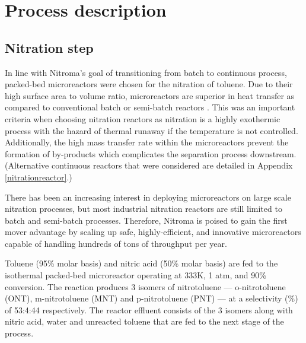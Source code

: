 \section{Process description}
\label{sec:process}
\subsection{Nitration step}
In line with Nitroma's goal of transitioning from batch to continuous process, packed-bed microreactors were chosen for the nitration of toluene. Due to their high surface area to volume ratio, microreactors are superior in heat transfer as compared to conventional batch or semi-batch reactors \cite{halder_nitration_2007}. This was an important criteria when choosing nitration reactors as nitration is a highly exothermic process with the hazard of thermal runaway if the temperature is not controlled. Additionally, the high mass transfer rate within the microreactors prevent the formation of by-products \cite{halder_nitration_2007} which complicates the separation process downstream.
(Alternative continuous reactors that were considered are detailed in Appendix \ref{nitrationreactor}.)

There has been an increasing interest in deploying microreactors on large scale nitration processes, but most industrial nitration reactors are still limited to batch and semi-batch processes. Therefore, Nitroma is poised to gain the first mover advantage by scaling up safe, highly-efficient, and innovative microreactors capable of handling hundreds of tons of throughput per year.

Toluene (95\% molar basis) and nitric acid (50\% molar basis) are fed to the isothermal packed-bed microreactor operating at 333K, 1 atm, and 90\% conversion. The reaction produces 3 isomers of nitrotoluene --- o-nitrotoluene (ONT), m-nitrotoluene (MNT) and p-nitrotoluene (PNT) --- at a selectivity (\%) of 53:4:44 respectively. The reactor effluent consists of the 3 isomers along with nitric acid, water and unreacted toluene that are fed to the next stage of the process.

